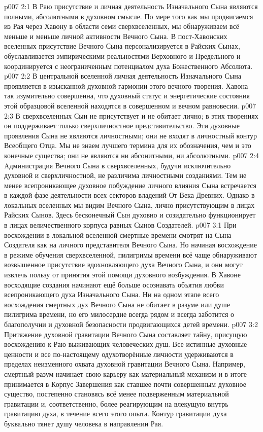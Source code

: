 \vs p007 2:1 В Раю присутствие и личная деятельность Изначального Сына являются полными, абсолютными в духовном смысле. По мере того как мы продвигаемся из Рая через Хавону в области семи сверхвселенных, мы обнаруживаем всё меньше и меньше личной активности Вечного Сына. В пост\hyp{}Хавонских вселенных присутствие Вечного Сына персонализируется в Райских Сынах, обуславливается эмпирическими реальностями Верховного и Предельного и координируется с неограниченным потенциалом духа Божественного Абсолюта.
\vs p007 2:2 В центральной вселенной личная деятельность Изначального Сына проявляется в изысканной духовной гармонии этого вечного творения. Хавона так изумительно совершенна, что духовный статус и энергетические состояния этой образцовой вселенной находятся в совершенном и вечном равновесии.
\vs p007 2:3 В сверхвселенных Сын не присутствует и не обитает лично; в этих творениях он поддерживает только сверхличностное представительство. Эти духовные проявления Сына не являются личностными; они не входят в личностный контур Всеобщего Отца. Мы не знаем лучшего термина для их обозначения, чем  и это конечные существа; они не являются ни абсонитными, ни абсолютными.
\vs p007 2:4 Aдминистрация Вечного Сына в сверхвселенных, будучи исключительно духовной и сверхличностной, не различима личностными созданиями. Тем не менее всепроникающее духовное побуждение личного влияния Сына встречается в каждой фазе деятельности всех секторов владений От Века Древних. Однако в локальных вселенных мы видим Вечного Сына, лично присутствующим в лицах Райских Сынов. Здесь бесконечный Сын духовно и созидательно функционирует в лицах величественного корпуса равных Сынов Создателей.
\vs p007 3:1 При восхождении в локальной вселенной смертные времени смотрят на Сына Создателя как на личного представителя Вечного Сына. Но начиная восхождение в режиме обучения сверхвселенной, пилигримы времени всё чаще обнаруживают возвышенное присутствие вдохновляющего духа Вечного Сына, и они могут извлечь пользу от принятия этой помощи духовного возбуждения. В Хавоне восходящие создания начинают ещё больше осознавать объятия любви всепроникающего духа Изначального Сына. Ни на одном этапе всего восхождения смертных дух Вечного Сына не обитает в разуме или душе пилигрима времени, но его милосердие всегда рядом и всегда заботится о благополучии и духовной безопасности продвигающихся детей времени.
\vs p007 3:2 Притяжение духовной гравитации Вечного Сына составляет тайну, присущую восхождению к Раю выживающих человеческих душ. Все истинные духовные ценности и все по\hyp{}настоящему одухотворённые личности удерживаются в пределах неизменного охвата духовной гравитации Вечного Сына. Например, смертный разум начинает свою карьеру как материальный механизм и в итоге принимается в Корпус Завершения как ставшее почти совершенным духовное существо, постепенно становясь всё менее подверженным материальной гравитации и, соответственно, более реагирующим на влекущую внутрь гравитацию духа, в течение всего этого опыта. Контур гравитации духа буквально тянет душу человека в направлении Рая.
